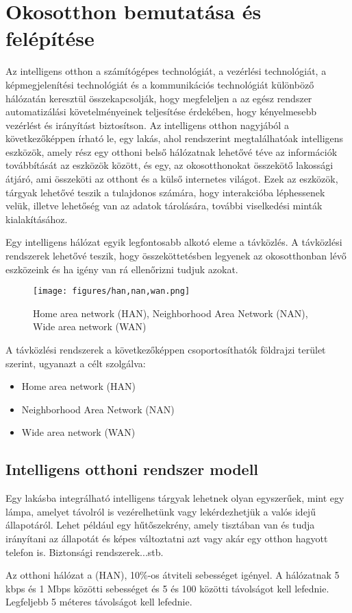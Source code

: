 \chapter{Okosotthon bemutatása és felépítése}

Az intelligens otthon a számítógépes technológiát, a vezérlési technológiát, a képmegjelenítési technológiát és a kommunikációs technológiát különböző hálózatán keresztül összekapcsolják, hogy megfeleljen a
az egész rendszer automatizálási követelményeinek teljesítése érdekében, hogy kényelmesebb vezérlést és irányítást biztosítson. Az intelligens otthon nagyjából a következőképpen írható le,
egy lakás, ahol rendszerint megtalálhatóak intelligens eszközök, amely rész egy otthoni belső
hálózatnak lehetővé téve az információk továbbítását
az eszközök között, és egy, az okosotthonokat összekötő lakossági átjáró, ami összeköti az otthont és a külső internetes világot. Ezek az eszközök, tárgyak
lehetővé teszik a tulajdonos számára, hogy interakcióba léphessenek velük, illetve lehetőség van az adatok tárolására, további viselkedési minták kialakításához.
\par Egy intelligens hálózat egyik legfontosabb alkotó eleme 
a távközlés. A távközlési rendszerek lehetővé teszik, hogy összeköttetésben legyenek az okosotthonban lévő eszközeink és ha igény van rá ellenőrizni tudjuk azokat.
\begin{figure}[!ht]
    \centering
    \texttt{[image: figures/han,nan,wan.png]}
    \caption{Home area network (HAN), Neighborhood Area Network (NAN), Wide area network (WAN) }
\end{figure}
\newline A távközlési rendszerek a következőképpen csoportosíthatók
földrajzi terület szerint, ugyanazt a célt szolgálva:
\begin{itemize}
    \setlength\itemsep{-2pt}
    \item Home area network (HAN)
    \item Neighborhood Area Network (NAN)
    \item Wide area network (WAN)
\end{itemize}
\section{Intelligens otthoni rendszer modell}
Egy lakásba integrálható intelligens tárgyak lehetnek olyan egyszerűek, mint egy lámpa, amelyet távolról is vezérelhetünk vagy lekérdezhetjük a valós idejű állapotáról. Lehet például egy hűtőszekrény, amely tisztában van és tudja irányítani az állapotát és képes változtatni azt vagy akár egy otthon hagyott telefon is. Biztonsági rendszerek...stb.
\par Az otthoni hálózat a (HAN), 10\%-os átviteli sebességet igényel.
A hálózatnak 5 kbps és 1 Mbps közötti sebességet és 5 és 100 közötti távolságot kell lefednie.
Legfeljebb 5 méteres távolságot kell lefednie.

